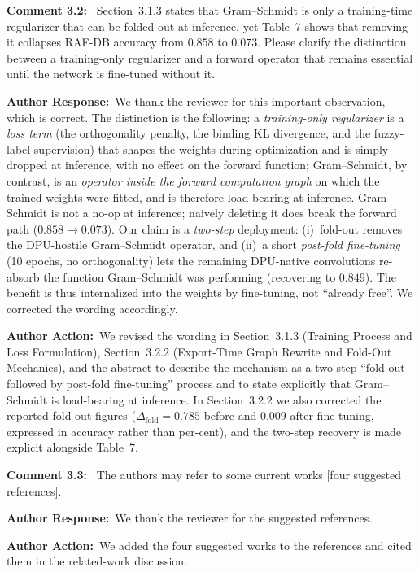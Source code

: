 \documentclass[11pt]{article}
\newcommand{\comment}[1]{\smallskip\noindent\textbf{\color{navy}Comment #1:}\ }
\newcommand{\response}{\smallskip\par\noindent\textbf{\color{steel}Author Response:}\ }
\newcommand{\action}{\smallskip\par\noindent\textbf{\color{steel}Author Action:}\ }
\begin{document}
\comment{3.2} Section~3.1.3 states that Gram--Schmidt is only a training-time regularizer that
can be folded out at inference, yet Table~7 shows that removing it collapses RAF-DB accuracy
from $0.858$ to $0.073$. Please clarify the distinction between a training-only regularizer
and a forward operator that remains essential until the network is fine-tuned without it.
\response We thank the reviewer for this important observation, which is correct. The
distinction is the following: a \emph{training-only regularizer} is a \emph{loss term} (the
orthogonality penalty, the binding KL divergence, and the fuzzy-label supervision) that shapes
the weights during optimization and is simply dropped at inference, with no effect on the
forward function; Gram--Schmidt, by contrast, is an \emph{operator inside the forward
computation graph} on which the trained weights were fitted, and is therefore load-bearing at
inference.
Gram--Schmidt is not a no-op at inference; naively deleting it does break the forward path
($0.858\rightarrow0.073$). Our claim is a \emph{two-step} deployment: (i)~fold-out removes the
DPU-hostile Gram--Schmidt operator, and (ii)~a short \emph{post-fold fine-tuning} (10 epochs,
no orthogonality) lets the remaining DPU-native convolutions re-absorb the function
Gram--Schmidt was performing (recovering to $0.849$). The benefit is thus internalized into
the weights by fine-tuning, not ``already free''. We corrected the wording accordingly.
\action We revised the wording in Section~3.1.3 (Training Process and Loss Formulation),
Section~3.2.2 (Export-Time Graph Rewrite and Fold-Out Mechanics), and the abstract to describe
the mechanism as a two-step ``fold-out followed by post-fold fine-tuning'' process and to state
explicitly that Gram--Schmidt is load-bearing at inference. In Section~3.2.2 we also corrected
the reported fold-out figures ($\Delta_{\mathrm{fold}}=0.785$ before and $0.009$ after
fine-tuning, expressed in accuracy rather than per-cent), and the two-step recovery is made
explicit alongside Table~7.

\comment{3.3} The authors may refer to some current works
[four suggested references].
\response We thank the reviewer for the suggested references.
\action We added the four suggested works to the references and cited them in the related-work
discussion.
\end{document}
